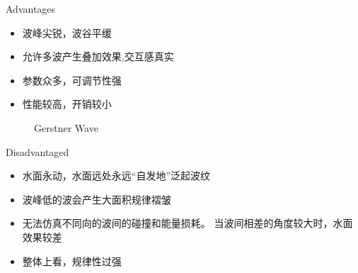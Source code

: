 \documentclass[handout,t]{beamer}
\begin{document}
\begin{frame}{Advantages}
  \begin{itemize}
    \item 波峰尖锐，波谷平缓
    \item 允许多波产生叠加效果,交互感真实
    \item 参数众多，可调节性强
    \item 性能较高，开销较小
  \end{itemize}
  \begin{figure}[thpb]
    \centering
  \caption{Gerstner Wave}\label{fig:gerstner_dem}
  \end{figure}
\end{frame}

\begin{frame}{Disadvantaged}
  \begin{itemize}
    \item 水面永动，水面远处永远“自发地”泛起波纹
    \item 波峰低的波会产生大面积规律褶皱
    \item 无法仿真不同向的波间的碰撞和能量损耗。
        当波间相差的角度较大时，水面效果较差
    \item 整体上看，规律性过强
  \end{itemize}
\end{frame}
\end{document}
